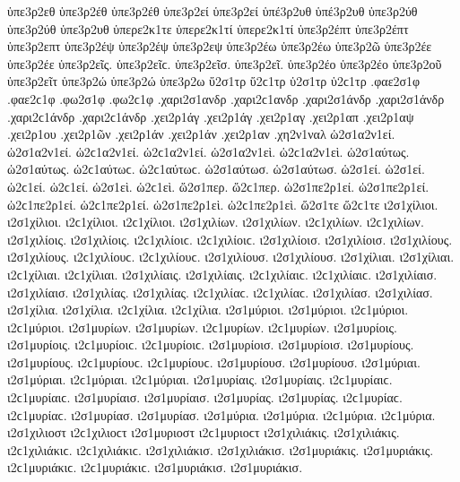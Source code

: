 {ὑπε3ρ2εθ   %
ὑπε3ρ2έθ ὑπε3ρ2έθ
ὑπε3ρ2εί ὑπε3ρ2εί   %
ὑπέ3ρ2υθ ὑπέ3ρ2υθ   %
ὑπε3ρ2ύθ ὑπε3ρ2ύθ
ὑπε3ρ2υθ   %
ὑπερε2κ1τε   %
ὑπερε2κ1τί ὑπερε2κ1τί   %
ὑπε3ρ2έπτ ὑπε3ρ2έπτ   %
ὑπε3ρ2επτ
ὑπε3ρ2έψ ὑπε3ρ2έψ
ὑπε3ρ2εψ
ὑπε3ρ2έω ὑπε3ρ2έω   %
ὑπε3ρ2ῶ
ὑπε3ρ2έε ὑπε3ρ2έε
ὑπε3ρ2εῖς. ὑπε3ρ2εῖϲ.
ὑπε3ρ2εῖσ.
ὑπε3ρ2εῖ.
ὑπε3ρ2έο ὑπε3ρ2έο
ὑπε3ρ2οῦ
ὑπε3ρ2εῖτ
ὑπε3ρ2ώ ὑπε3ρ2ώ   %
ὑπε3ρ2ω   %
ὕ2σ1τρ ὕ2ϲ1τρ   %
ὑ2σ1τρ ὑ2ϲ1τρ   %
.φαε2σ1φ .φαε2ϲ1φ   %
.φω2σ1φ .φω2ϲ1φ   %
.χαρι2σ1ανδρ .χαρι2ϲ1ανδρ   %
.χαρι2σ1άνδρ .χαρι2σ1άνδρ .χαρι2ϲ1άνδρ .χαρι2ϲ1άνδρ
.χει2ρ1άγ .χει2ρ1άγ   %
.χει2ρ1αγ   %
.χει2ρ1απ   %
.χει2ρ1αψ   %
.χει2ρ1ου   %
.χει2ρ1ῶν   %
.χει2ρ1άν .χει2ρ1άν
.χει2ρ1αν
.χη2ν1ναλ   %
ὡ2σ1α2ν1εί. ὡ2σ1α2ν1εί. ὡ2ϲ1α2ν1εί. ὡ2ϲ1α2ν1εί.   %
ὡ2σ1α2ν1εὶ. ὡ2ϲ1α2ν1εὶ.
ὡ2σ1αύτως. ὡ2σ1αύτως. ὡ2ϲ1αύτωϲ. ὡ2ϲ1αύτωϲ.   %
ὡ2σ1αύτωσ. ὡ2σ1αύτωσ.
ὡ2σ1εί. ὡ2σ1εί. ὡ2ϲ1εί. ὡ2ϲ1εί.   %
ὡ2σ1εὶ. ὡ2ϲ1εὶ.
ὥ2σ1περ. ὥ2ϲ1περ.   %
ὡ2σ1πε2ρ1εί. ὡ2σ1πε2ρ1εί. ὡ2ϲ1πε2ρ1εί. ὡ2ϲ1πε2ρ1εί.   %
ὡ2σ1πε2ρ1εὶ. ὡ2ϲ1πε2ρ1εὶ.
ὥ2σ1τε ὥ2ϲ1τε   %
ι2σ1χίλιοι. ι2σ1χίλιοι. ι2ϲ1χίλιοι. ι2ϲ1χίλιοι.   %
ι2σ1χιλίων. ι2σ1χιλίων. ι2ϲ1χιλίων. ι2ϲ1χιλίων.
ι2σ1χιλίοις. ι2σ1χιλίοις. ι2ϲ1χιλίοιϲ. ι2ϲ1χιλίοιϲ.
ι2σ1χιλίοισ. ι2σ1χιλίοισ.
ι2σ1χιλίους. ι2σ1χιλίους. ι2ϲ1χιλίουϲ. ι2ϲ1χιλίουϲ.
ι2σ1χιλίουσ. ι2σ1χιλίουσ.
ι2σ1χίλιαι. ι2σ1χίλιαι. ι2ϲ1χίλιαι. ι2ϲ1χίλιαι.
ι2σ1χιλίαις. ι2σ1χιλίαις. ι2ϲ1χιλίαιϲ. ι2ϲ1χιλίαιϲ.
ι2σ1χιλίαισ. ι2σ1χιλίαισ.
ι2σ1χιλίας. ι2σ1χιλίας. ι2ϲ1χιλίαϲ. ι2ϲ1χιλίαϲ.
ι2σ1χιλίασ. ι2σ1χιλίασ.
ι2σ1χίλια. ι2σ1χίλια. ι2ϲ1χίλια. ι2ϲ1χίλια.
%
ι2σ1μύριοι. ι2σ1μύριοι. ι2ϲ1μύριοι. ι2ϲ1μύριοι.   %
ι2σ1μυρίων. ι2σ1μυρίων. ι2ϲ1μυρίων. ι2ϲ1μυρίων.
ι2σ1μυρίοις. ι2σ1μυρίοις. ι2ϲ1μυρίοιϲ. ι2ϲ1μυρίοιϲ.
ι2σ1μυρίοισ. ι2σ1μυρίοισ.
ι2σ1μυρίους. ι2σ1μυρίους. ι2ϲ1μυρίουϲ. ι2ϲ1μυρίουϲ.
ι2σ1μυρίουσ. ι2σ1μυρίουσ.
ι2σ1μύριαι. ι2σ1μύριαι. ι2ϲ1μύριαι. ι2ϲ1μύριαι.
ι2σ1μυρίαις. ι2σ1μυρίαις. ι2ϲ1μυρίαιϲ. ι2ϲ1μυρίαιϲ.
ι2σ1μυρίαισ. ι2σ1μυρίαισ.
ι2σ1μυρίας. ι2σ1μυρίας. ι2ϲ1μυρίαϲ. ι2ϲ1μυρίαϲ.
ι2σ1μυρίασ. ι2σ1μυρίασ.
ι2σ1μύρια. ι2σ1μύρια. ι2ϲ1μύρια. ι2ϲ1μύρια.
%
ι2σ1χιλιοστ ι2ϲ1χιλιοϲτ   %
%
ι2σ1μυριοστ ι2ϲ1μυριοϲτ   %
%
ι2σ1χιλιάκις. ι2σ1χιλιάκις. ι2ϲ1χιλιάκιϲ. ι2ϲ1χιλιάκιϲ.   %
ι2σ1χιλιάκισ. ι2σ1χιλιάκισ.
%
ι2σ1μυριάκις. ι2σ1μυριάκις. ι2ϲ1μυριάκιϲ. ι2ϲ1μυριάκιϲ.   %
ι2σ1μυριάκισ. ι2σ1μυριάκισ.
}

